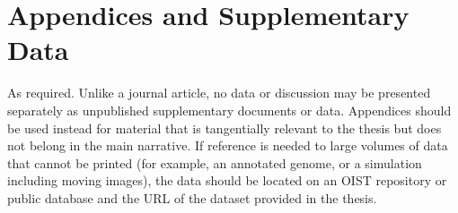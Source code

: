 

\chapter{Appendices and Supplementary Data} \label{appB}

As required.  Unlike a journal article, no data or discussion may be presented separately as unpublished supplementary documents or data.  Appendices should be used instead for material that is tangentially relevant to the thesis but does not belong in the main narrative.  If reference is needed to large volumes of data that cannot be printed (for example, an annotated genome, or a simulation including moving images), the data should be located on an OIST repository or public database and the URL of the dataset provided in the thesis.